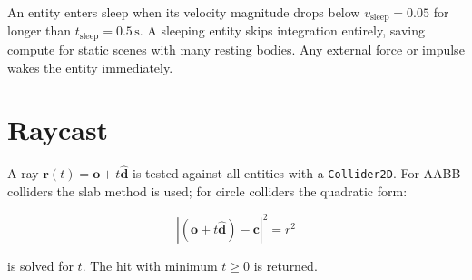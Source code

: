 An entity enters sleep when its velocity magnitude drops below
$v_\text{sleep} = 0.05$ for longer than $t_\text{sleep} = 0.5\,\text{s}$.
A sleeping entity skips integration entirely, saving compute for
static scenes with many resting bodies. Any external force or impulse
wakes the entity immediately.

\section{Raycast}

A ray $\mathbf{r}(t) = \mathbf{o} + t\hat{\mathbf{d}}$ is tested against
all entities with a \texttt{Collider2D}. For AABB colliders the
slab method is used; for circle colliders the quadratic form:

\begin{equation}
|(\mathbf{o} + t\hat{\mathbf{d}}) - \mathbf{c}|^2 = r^2
\end{equation}

is solved for $t$. The hit with minimum $t \geq 0$ is returned.
